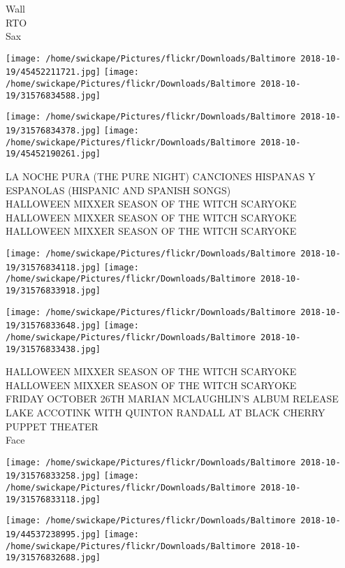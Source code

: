 \documentclass[10pt,letterpaper]{article}
\begin{document}
Wall\\
RTO\\
Sax\\
\pagebreak

\texttt{[image: /home/swickape/Pictures/flickr/Downloads/Baltimore 2018-10-19/45452211721.jpg]}
\texttt{[image: /home/swickape/Pictures/flickr/Downloads/Baltimore 2018-10-19/31576834588.jpg]}

\texttt{[image: /home/swickape/Pictures/flickr/Downloads/Baltimore 2018-10-19/31576834378.jpg]}
\texttt{[image: /home/swickape/Pictures/flickr/Downloads/Baltimore 2018-10-19/45452190261.jpg]}

LA NOCHE PURA (THE PURE NIGHT) CANCIONES HISPANAS Y ESPANOLAS (HISPANIC AND SPANISH SONGS)\\
HALLOWEEN MIXXER SEASON OF THE WITCH SCARYOKE\\
HALLOWEEN MIXXER SEASON OF THE WITCH SCARYOKE\\
HALLOWEEN MIXXER SEASON OF THE WITCH SCARYOKE\\
\pagebreak

\texttt{[image: /home/swickape/Pictures/flickr/Downloads/Baltimore 2018-10-19/31576834118.jpg]}
\texttt{[image: /home/swickape/Pictures/flickr/Downloads/Baltimore 2018-10-19/31576833918.jpg]}

\texttt{[image: /home/swickape/Pictures/flickr/Downloads/Baltimore 2018-10-19/31576833648.jpg]}
\texttt{[image: /home/swickape/Pictures/flickr/Downloads/Baltimore 2018-10-19/31576833438.jpg]}

HALLOWEEN MIXXER SEASON OF THE WITCH SCARYOKE\\
HALLOWEEN MIXXER SEASON OF THE WITCH SCARYOKE\\
FRIDAY OCTOBER 26TH MARIAN MCLAUGHLIN'S ALBUM RELEASE LAKE ACCOTINK WITH QUINTON RANDALL AT BLACK CHERRY PUPPET THEATER\\
Face\\
\pagebreak

\texttt{[image: /home/swickape/Pictures/flickr/Downloads/Baltimore 2018-10-19/31576833258.jpg]}
\texttt{[image: /home/swickape/Pictures/flickr/Downloads/Baltimore 2018-10-19/31576833118.jpg]}

\texttt{[image: /home/swickape/Pictures/flickr/Downloads/Baltimore 2018-10-19/44537238995.jpg]}
\texttt{[image: /home/swickape/Pictures/flickr/Downloads/Baltimore 2018-10-19/31576832688.jpg]}
\end{document}
